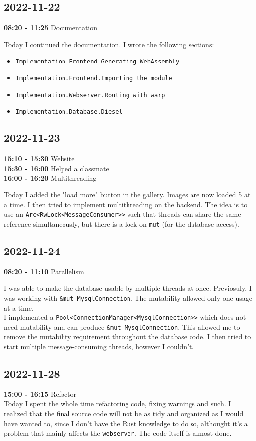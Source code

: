 \documentclass{article}
\begin{document}
\subsection{2022-11-22}

\textbf{08:20 - 11:25} Documentation

Today I continued the documentation.
I wrote the following sections:
\begin{itemize}
    \item \texttt{Implementation.Frontend.Generating WebAssembly}
    \item \texttt{Implementation.Frontend.Importing the module}
    \item \texttt{Implementation.Webserver.Routing with warp}
    \item \texttt{Implementation.Database.Diesel}
\end{itemize}

\subsection{2022-11-23}

\textbf{15:10 - 15:30} Website \\
\textbf{15:30 - 16:00} Helped a classmate \\
\textbf{16:00 - 16:20} Multithreading

Today I added the "load more" button in the gallery.
Images are now loaded 5 at a time.
I then tried to implement multithreading on the backend.
The idea is to use an \texttt{Arc<RwLock<MessageConsumer>>} such that
threads can share the same reference simultaneously, but there
is a lock on \texttt{mut} (for the database access).

\subsection{2022-11-24}

\textbf{08:20 - 11:10} Parallelism

I was able to make the database usable by multiple threads at once.
Previosuly, I was working with \texttt{\&mut MysqlConnection}.
The mutability allowed only one usage at a time. \\
I implemented a \texttt{Pool<ConnectionManager<MysqlConnection>>} which does not
need mutability and can produce \texttt{\&mut MysqlConnection}.
This allowed me to remove the mutability requirement throughout the database
code. I then tried to start multiple message-consuming threads, however I
couldn't.

\subsection{2022-11-28}

\textbf{15:00 - 16:15} Refactor \\

Today I spent the whole time refactoring code,
fixing warnings and such. I realized that the final source
code will not be as tidy and organized as I would have wanted to,
since I don't have the Rust knowledge to do so, althought it's a problem
that mainly affects the \texttt{webserver}.
The code itself is almost done.
\end{document}
